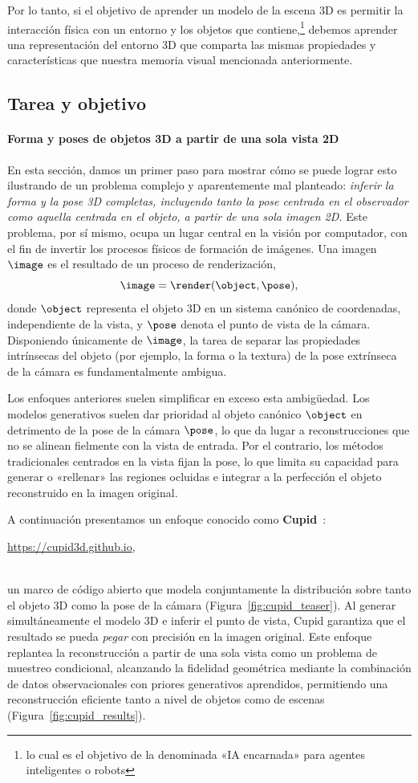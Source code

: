 \documentclass[../../book-main_es.tex]{subfiles}
\begin{document}
Por lo tanto, si el objetivo de aprender un modelo de la escena 3D es permitir la 
interacción física con un entorno y los objetos que contiene,\footnote{lo cual es el 
objetivo de la denominada «IA encarnada» para agentes inteligentes o robots} debemos 
aprender una representación del entorno 3D que comparta las mismas propiedades y 
características que nuestra memoria visual mencionada anteriormente.


\subsection{Tarea y objetivo}
\label{sub:cupid_objective}

\paragraph{Forma y poses de objetos 3D a partir de una sola vista 2D}
En esta sección, damos un primer paso para mostrar cómo se puede
lograr esto ilustrando de un problema complejo y aparentemente mal planteado:
{\em inferir la forma y la pose 3D completas, incluyendo
tanto la pose centrada en el observador como aquella centrada en el objeto, a partir de una sola
imagen 2D.} Este problema, por sí mismo, ocupa un lugar central en la visión por computador,
con el fin de invertir los procesos físicos de formación de imágenes. Una imagen
$\image$ es el resultado de un proceso de renderización,
\[
\image = \render(\object, \pose),
\]
donde $\object$ representa el objeto 3D en un sistema canónico de coordenadas,
independiente de la vista, y $\pose$ denota el punto de vista de la cámara. Disponiendo únicamente
de $\image$, la tarea de separar las propiedades intrínsecas del objeto
(por ejemplo, la forma o la textura) de la pose extrínseca de la cámara es
fundamentalmente ambigua.

Los enfoques anteriores suelen simplificar en exceso esta ambigüedad. Los modelos generativos 
suelen dar prioridad al objeto canónico $\object$ en detrimento de la pose de la cámara $\pose$, 
lo que da lugar a reconstrucciones que no se alinean fielmente con la vista de entrada. Por el 
contrario, los métodos tradicionales centrados en la vista fijan la pose, lo que limita su 
capacidad para generar o «rellenar» las regiones ocluidas e integrar a la perfección el 
objeto reconstruido en la imagen original.

A continuación presentamos un enfoque conocido como \textbf{Cupid}~\citep{huang2025cupid}:
\\
\centerline{\url{https://cupid3d.github.io},}\\ 
un marco de código abierto que modela conjuntamente la distribución sobre tanto el objeto 3D como 
la pose de la cámara (Figura~\ref{fig:cupid_teaser}). Al generar simultáneamente el 
modelo 3D e inferir el punto de vista, Cupid garantiza que el resultado 
se pueda \textit{pegar} con precisión en la imagen original. Este enfoque replantea la 
reconstrucción a partir de una sola vista como un problema de muestreo condicional, alcanzando 
la fidelidad geométrica mediante la combinación de datos observacionales con priores generativos 
aprendidos, permitiendo una reconstrucción eficiente tanto a nivel de objetos como de 
escenas (Figura~\ref{fig:cupid_results}).
\end{document}

